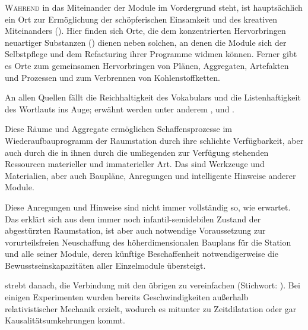 \begin{newstuff}
   \lettrine{W}{ährend} in  das Miteinander der Module im Vordergrund steht, ist  hauptsächlich ein Ort zur Ermöglichung der schöpferischen Einsamkeit und des kreativen Miteinanders (). Hier finden sich Orte, die dem konzentrierten Hervorbringen neuartiger Substanzen () dienen neben solchen, an denen die Module sich der Selbstpflege und dem Refacturing ihrer Programme widmen können. Ferner gibt es Orte zum gemeinsamen Hervorbringen von Plänen, Aggregaten, Artefakten und Prozessen und zum Verbrennen von Kohlenstoffketten. 


   An allen Quellen fällt die Reichhaltigkeit des Vokabulars und die Listenhaftigkeit des Wortlauts ins Auge; erwähnt werden unter anderem ,  und .

    Diese Räume und Aggregate ermöglichen Schaffensprozesse im Wiederaufbauprogramm der Raumstation durch ihre schlichte Verfügbarkeit, aber auch durch die in ihnen durch die umliegenden  zur Verfügung stehenden Ressourcen materieller und immaterieller Art. Das sind Werkzeuge und Materialien, aber auch Baupläne, Anregungen und intelligente Hinweise anderer Module. 

    Diese Anregungen und Hinweise sind nicht immer vollständig so, wie erwartet. Das erklärt sich aus dem immer noch infantil-semidebilen Zustand der abgestürzten Raumstation, ist aber auch notwendige Voraussetzung zur vorurteilsfreien Neuschaffung des höherdimensionalen Bauplans für die Station und alle seiner Module, deren künftige Beschaffenheit notwendigerweise die Bewusstseinskapazitäten aller Einzelmodule übersteigt.

     strebt danach, die Verbindung mit den übrigen  zu vereinfachen (Stichwort: ). Bei einigen Experimenten wurden bereits Geschwindigkeiten außerhalb relativistischer Mechanik erzielt, wodurch es mitunter zu Zeitdilatation oder gar Kausalitätsumkehrungen kommt. 
    


\end{newstuff}
